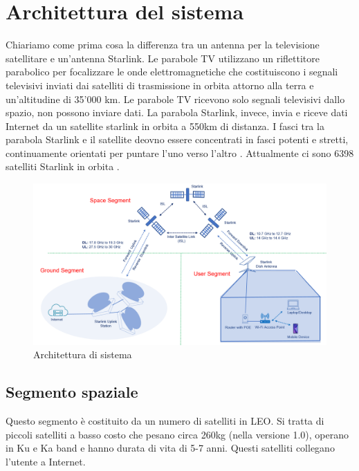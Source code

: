 
\chapter{Architettura del sistema}

Chiariamo come prima cosa la differenza tra un antenna per la televisione satellitare e un'antenna Starlink.
Le parabole TV utilizzano un riflettitore parabolico per focalizzare le onde elettromagnetiche che costituiscono i segnali televisivi inviati dai satelliti di trasmissione in orbita attorno alla terra e un'altitudine di 35'000 km.
Le parabole TV ricevono solo segnali televisivi dallo spazio, non possono inviare dati.
La parabola Starlink, invece, invia e riceve dati Internet da un satellite starlink in orbita a 550km di distanza.
I fasci tra la parabola Starlink e il satellite deovno essere concentrati in fasci potenti e stretti, continuamente orientati per puntare l'uno verso l'altro \cite{branch_education_how_2022}.
Attualmente ci sono 6398 satelliti Starlink in orbita \cite{jonathan_mcdowell_starlink_nodate}.

\begin{figure}[ht]
  \centering
  \includegraphics[width=0.9\linewidth]{./res/img/starlink-system-architecture.png}
  \caption{Architettura di sistema \cite{techplayon_spacex_2024}}
  \label{fig:starlink-system-architecture}
\end{figure}

\section{Segmento spaziale}
Questo segmento è costituito da un numero di satelliti in \ac{LEO}. Si tratta di piccoli satelliti a basso costo che pesano circa 260kg (nella versione 1.0), operano in \ac{Ku} e \ac{Ka} band e hanno durata di vita di 5-7 anni. \cite{techplayon_spacex_2024} Questi satelliti collegano l'utente a Internet.

